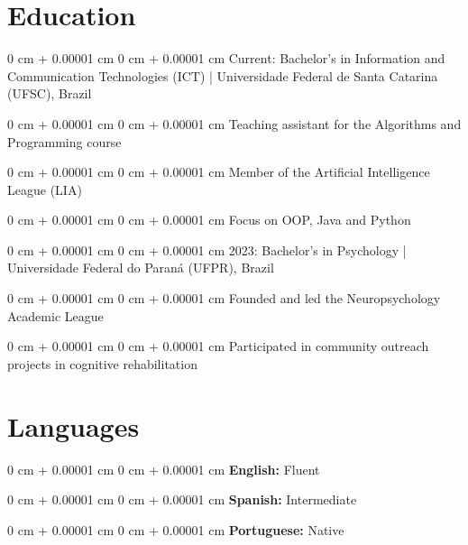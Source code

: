 \documentclass[10pt, letterpaper]{article}
\newenvironment{onecolentry}{
    \begin{adjustwidth}{
        0 cm + 0.00001 cm
    }{
        0 cm + 0.00001 cm
    }
}{
    \end{adjustwidth}
}
\begin{document}
\section{Education}
\begin{onecolentry}{Current: Bachelor's in Information and Communication Technologies (ICT) | Universidade Federal de Santa Catarina (UFSC), Brazil}\end{onecolentry}
\vspace{0.2cm}
\begin{onecolentry}{Teaching assistant for the Algorithms and Programming course}\end{onecolentry}
\vspace{0.2cm}
\begin{onecolentry}{Member of the Artificial Intelligence League (LIA)}\end{onecolentry}
\vspace{0.2cm}
\begin{onecolentry}{Focus on OOP, Java and Python}\end{onecolentry}
\vspace{0.2cm}
\begin{onecolentry}{2023: Bachelor's in Psychology | Universidade Federal do Paraná (UFPR), Brazil}\end{onecolentry}
\vspace{0.2cm}
\begin{onecolentry}{Founded and led the Neuropsychology Academic League}\end{onecolentry}
\vspace{0.2cm}
\begin{onecolentry}{Participated in community outreach projects in cognitive rehabilitation}\end{onecolentry}
\section{Languages}
\begin{onecolentry}{\textbf{English:} Fluent}\end{onecolentry}
\vspace{0.1cm}
\begin{onecolentry}{\textbf{Spanish:} Intermediate}\end{onecolentry}
\vspace{0.1cm}
\begin{onecolentry}{\textbf{Portuguese:} Native}\end{onecolentry}
\end{document}
